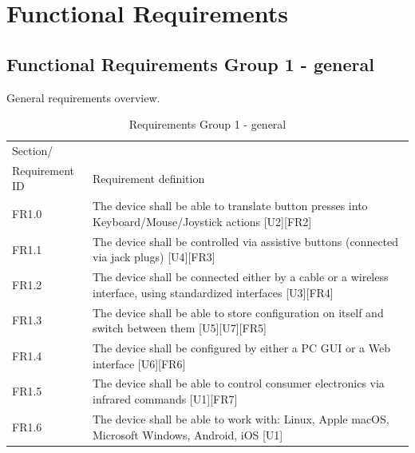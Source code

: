 \documentclass[]{scrreprt}%
\newcommand{\note}[1]{\textcolor{black!50}{\textit{Note: #1}}}
\begin{document}
% 


\section{Functional Requirements}


\subsection{Functional Requirements Group 1 - general}

General requirements overview.

\begin{table}[htb!]
 \centering
 \caption{Requirements Group 1 - general}
\label{req_group1}
 \begin{tabularx}{\textwidth}{|l|X|} \hline
 Section/\\ Requirement ID & Requirement definition\\ \hline  \hline
 FR1.0 & The device shall be able to translate button presses into Keyboard/Mouse/Joystick actions [U2][FR2]\\ \hline
 FR1.1 & The device shall be controlled via assistive buttons (connected via jack plugs) [U4][FR3]\\ \hline
 FR1.2 & The device shall be connected either by a cable or a wireless interface, using standardized interfaces [U3][FR4]\\ \hline
 FR1.3 & The device shall be able to store configuration on itself and switch between them [U5][U7][FR5]\\ \hline
 FR1.4 & The device shall be configured by either a PC GUI or a Web interface [U6][FR6]\\ \hline
 FR1.5 & The device shall be able to control consumer electronics via infrared commands [U1][FR7]\\ \hline
 FR1.6 & The device shall be able to work with: Linux, Apple macOS, Microsoft Windows, Android, iOS [U1]\\ \hline
 \end{tabularx}
\end{table}
\end{document}
